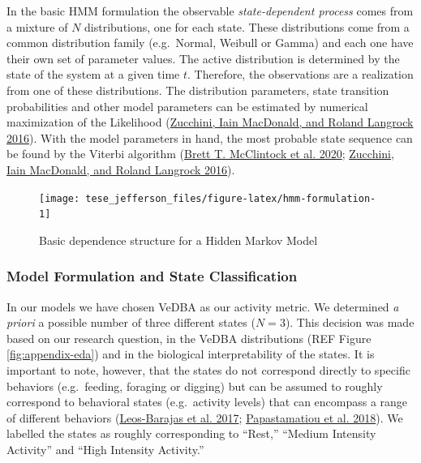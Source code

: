 \documentclass[msc,numbers,hidelinks]{coppe}
\begin{document}
  In the basic HMM formulation the observable \emph{state-dependent process} comes from a mixture of \(N\) distributions, one for each state. These distributions come from a common distribution family (e.g.~Normal, Weibull or Gamma) and each one have their own set of parameter values. The active distribution is determined by the state of the system at a given time \(t\). Therefore, the observations are a realization from one of these distributions. The distribution parameters, state transition probabilities and other model parameters can be estimated by numerical maximization of the Likelihood (\protect\hyperlink{ref-zucchini2016}{Zucchini, Iain MacDonald, and Roland Langrock 2016}). With the model parameters in hand, the most probable state sequence can be found by the Viterbi algorithm (\protect\hyperlink{ref-mcclintock2020}{Brett T. McClintock et al. 2020}; \protect\hyperlink{ref-zucchini2016}{Zucchini, Iain MacDonald, and Roland Langrock 2016}).
  \begin{figure}

  {\centering \texttt{[image: tese\_jefferson\_files/figure-latex/hmm-formulation-1]} 

  }

  \caption{Basic dependence structure for a Hidden Markov Model}\label{fig:hmm-formulation}
  \end{figure}
  \hypertarget{model-formulation-and-state-classification}{%
  \subsubsection{Model Formulation and State Classification}\label{model-formulation-and-state-classification}}

  In our models we have chosen VeDBA as our activity metric. We determined \emph{a priori} a possible number of three different states (\(N=3\)). This decision was made based on our research question, in the VeDBA distributions (REF Figure \ref{fig:appendix-eda}) and in the biological interpretability of the states. It is important to note, however, that the states do not correspond directly to specific behaviors (e.g.~feeding, foraging or digging) but can be assumed to roughly correspond to behavioral states (e.g.~activity levels) that can encompass a range of different behaviors (\protect\hyperlink{ref-leosbarajas2017}{Leos-Barajas et al. 2017}; \protect\hyperlink{ref-papastamatiou2018}{Papastamatiou et al. 2018}). We labelled the states as roughly corresponding to ``Rest,'' ``Medium Intensity Activity'' and ``High Intensity Activity.''
\end{document}
